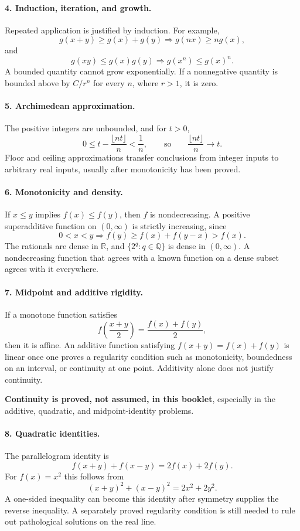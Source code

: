 \documentclass[12pt,a4paper]{article}
\begin{document}
\paragraph{4. Induction, iteration, and growth.}
Repeated application is justified by induction. For example,
\[
g(x+y)\ge g(x)+g(y)\Longrightarrow g(nx)\ge ng(x),
\]
and
\[
g(xy)\le g(x)g(y)\Longrightarrow g(x^n)\le g(x)^n.
\]
A bounded quantity cannot grow exponentially. If a nonnegative quantity is
bounded above by $C/r^n$ for every $n$, where $r>1$, it is zero.

\paragraph{5. Archimedean approximation.}
The positive integers are unbounded, and for $t>0$,
\[
0\le t-\frac{\lfloor nt\rfloor}{n}<\frac1n,
\qquad\text{so}\qquad
\frac{\lfloor nt\rfloor}{n}\longrightarrow t.
\]
Floor and ceiling approximations transfer conclusions from integer inputs to
arbitrary real inputs, usually after monotonicity has been proved.

\paragraph{6. Monotonicity and density.}
If $x\le y$ implies $f(x)\le f(y)$, then $f$ is nondecreasing. A positive
superadditive function on $(0,\infty)$ is strictly increasing, since
\[
0<x<y\Longrightarrow f(y)\ge f(x)+f(y-x)>f(x).
\]
The rationals are dense in $\mathbb R$, and
$\{2^q:q\in\mathbb Q\}$ is dense in $(0,\infty)$. A nondecreasing function
that agrees with a known function on a dense subset agrees with it everywhere.

\paragraph{7. Midpoint and additive rigidity.}
If a monotone function satisfies
\[
f\!\left(\frac{x+y}{2}\right)=\frac{f(x)+f(y)}2,
\]
then it is affine. An additive function satisfying
$f(x+y)=f(x)+f(y)$ is linear once one proves a regularity condition such as
monotonicity, boundedness on an interval, or continuity at one point.
Additivity alone does not justify continuity.

\textbf{Continuity is proved, not assumed, in this booklet}, especially in
the additive, quadratic, and midpoint-identity problems.

\paragraph{8. Quadratic identities.}
The parallelogram identity is
\[
f(x+y)+f(x-y)=2f(x)+2f(y).
\]
For $f(x)=x^2$ this follows from
\[
(x+y)^2+(x-y)^2=2x^2+2y^2.
\]
A one-sided inequality can become this identity after symmetry supplies the
reverse inequality. A separately proved regularity condition is still needed
to rule out pathological solutions on the real line.
\end{document}
